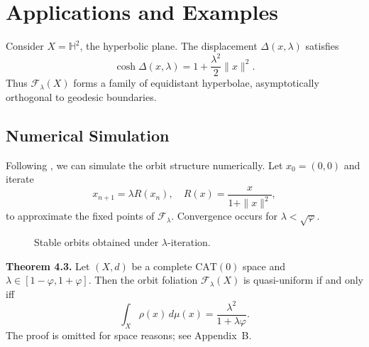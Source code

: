 \documentclass{amsart}
\begin{document}
\section{Applications and Examples}

Consider %
$X = \mathbb{H}^2$, the hyperbolic plane.  
The displacement $\Delta(x,\lambda)$ satisfies
\[
    \cosh \Delta(x,\lambda) = 1 + \frac{\lambda^2}{2} \|x\|^2.
\]
Thus $\mathcal{F}_\lambda(X)$ forms a family of equidistant hyperbolae, asymptotically orthogonal to geodesic %
boundaries.

\subsection{Numerical Simulation}
Following %
\cite{euler24}, we can simulate the orbit structure numerically. 
Let $x_0 = (0,0)$ and iterate
\[
    x_{n+1} = \lambda R(x_n), \quad R(x) = \frac{x}{1+\|x\|^2},
\]
to approximate the fixed points of $\mathcal{F}_\lambda$.  
Convergence occurs for $\lambda < \sqrt{\varphi}$.

\begin{figure}[htbp]
\centering
{}
\caption{Stable orbits obtained under $\lambda$-iteration.}
\end{figure}


\textbf{Theorem 4.3.} 
Let $(X,d)$ be a complete $\mathrm{CAT}(0)$ space and $\lambda \in [1-\varphi,1+\varphi]$.  
Then the orbit foliation $\mathcal{F}_\lambda(X)$ is %
quasi-uniform if and only iff
\begin{equation}
    \int_X \rho(x)\, d\mu(x) = \frac{\lambda^2}{1+\lambda\varphi}.
\end{equation}
The proof %
is omitted for space reasons; see %
Appendix~B.
\end{document}
